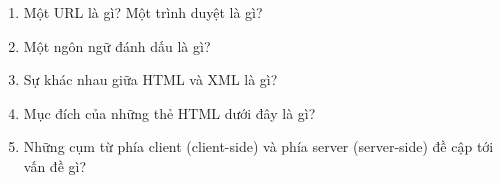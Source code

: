 \begin{enumerate}
\item Một URL là gì? Một trình duyệt là gì?
\item Một ngôn ngữ đánh dấu là gì?
\item Sự khác nhau giữa HTML và XML là gì?
\item Mục đích của những thẻ HTML dưới đây là gì?


\item Những cụm từ phía client (client-side) và phía server (server-side) đề cập tới vấn
  đề gì?
\end{enumerate}






























